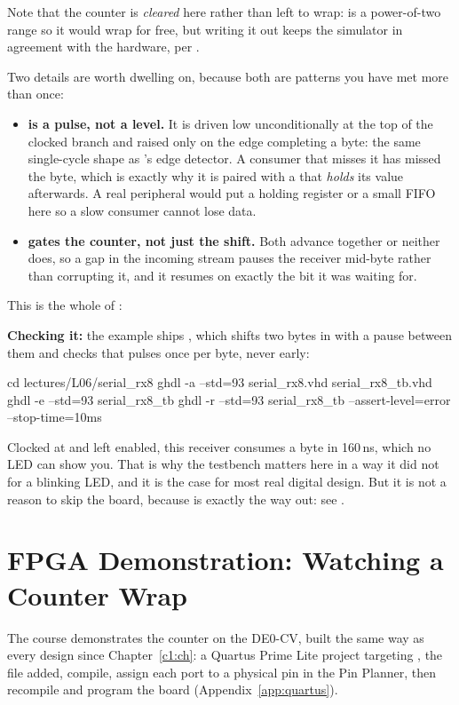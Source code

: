 Note that the counter is \emph{cleared} here rather than left to wrap:  is a
power-of-two range so it would wrap for free, but writing it out keeps the simulator in agreement
with the hardware, per .

Two details are worth dwelling on, because both are patterns you have met more than once:
\begin{itemize}
  \item \textbf{ is a pulse, not a level.} It is driven low unconditionally at the
    top of the clocked branch and raised only on the edge completing a byte: the same single-cycle
    shape as 's edge detector. A consumer that misses it has missed the byte, which
    is exactly why it is paired with a  that \emph{holds} its value afterwards. A
    real peripheral would put a holding register or a small FIFO here so a slow consumer cannot
    lose data.
  \item \textbf{ gates the counter, not just the shift.} Both advance together
    or neither does, so a gap in the incoming stream pauses the receiver mid-byte rather than
    corrupting it, and it resumes on exactly the bit it was waiting for.
\end{itemize}
This is the whole of :


\textbf{Checking it:} the example ships , which shifts two bytes in with a
pause between them and checks that  pulses once per byte, never early:

\begin{shell}
cd lectures/L06/serial_rx8
ghdl -a --std=93 serial_rx8.vhd serial_rx8_tb.vhd
ghdl -e --std=93 serial_rx8_tb
ghdl -r --std=93 serial_rx8_tb --assert-level=error --stop-time=10ms
\end{shell}

\noindent Clocked at  and left enabled, this receiver consumes a byte in 160\,ns,
which no LED can show you. That is why the testbench matters here in a way it did not for a
blinking LED, and it is the case for most real digital design. But it is not a reason to skip the
board, because  is exactly the way out: see .

\section{FPGA Demonstration: Watching a Counter Wrap}
\label{c6:a6}
The course demonstrates the counter on the DE0-CV, built the same way as every design since
Chapter~\ref{c1:ch}: a Quartus Prime Lite project targeting , the 
file added, compile, assign each port to a physical pin in the Pin Planner, then recompile and
program the board (Appendix~\ref{app:quartus}).


